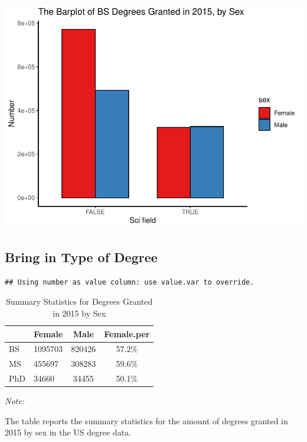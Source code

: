 \documentclass[
  12pt,
]{article}
\begin{document}
\includegraphics{hw1_sol_files/figure-latex/unnamed-chunk-9-1.pdf}

\hypertarget{bring-in-type-of-degree}{%
\subsection{Bring in Type of Degree}\label{bring-in-type-of-degree}}

\begin{verbatim}
## Using number as value column: use value.var to override.
\end{verbatim}

\begin{table}[H]

\caption{\label{tab:unnamed-chunk-10}Summary Statistics for Degrees Granted in 2015 by Sex}
\centering
\begin{threeparttable}
\begin{tabular}[t]{llcc}
\toprule
  & Female & Male & Female.per\\
\midrule
BS & 1095703 & 820426 & 57.2\%\\
MS & 455697 & 308283 & 59.6\%\\
PhD & 34660 & 34455 & 50.1\%\\
\bottomrule
\end{tabular}
\begin{tablenotes}
\item \textit{Note: } 
\item The table reports the summary statistics for the amount of degrees granted in 2015 by sex in the US degree data.
\end{tablenotes}
\end{threeparttable}
\end{table}
\end{document}

